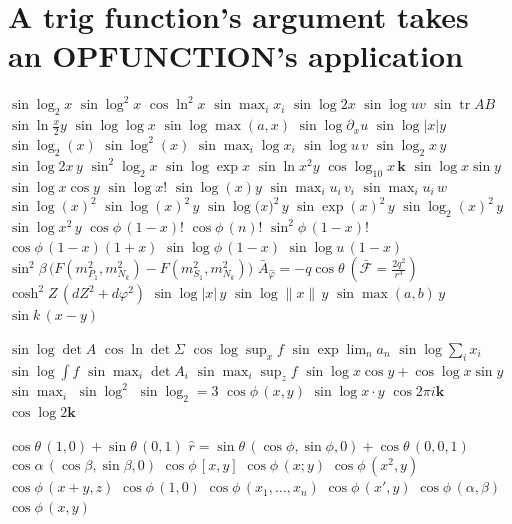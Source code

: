 \documentclass{article}
\begin{document}
\section{A trig function's argument takes an OPFUNCTION's application}
$\sin\log_2 x$ $\sin\log^2 x$ $\cos\ln^2 x$ $\sin\max_i x_i$ $\sin\log 2x$ $\sin\log uv$ $\sin\operatorname{tr}AB$ $\sin\ln\frac{x}{2}y$
$\sin\log\log x$ $\sin\log\max(a,x)$ $\sin\log\partial_x u$ $\sin\log|x|y$ $\sin\log_2(x)$ $\sin\log^2(x)$ $\sin\max_i\log x_i$
$\sin\log u\,v$ $\sin\log_2 x\,y$ $\sin\log 2x\,y$ $\sin^2\log_2 x$ $\sin\log\exp x$ $\sin\ln x^2 y$ $\cos\log_{10}x\,\mathbf k$
$\sin\log x\sin y$ $\sin\log x\cos y$ $\sin\log x!$ $\sin\log(x)y$ $\sin\max_i u_i\,v_i$ $\sin\max_i u_i\,w$
$\sin\log(x)^2$ $\sin\log(x)^2\,y$ $\sin\log\bigl(x\bigr)^{2}\,y$ $\sin\exp(x)^2\,y$ $\sin\log_2(x)^2\,y$ $\sin\log x^2\,y$
$\cos\phi\,(1-x)!$ $\cos\phi\,(n)!$ $\sin^2\phi\,(1-x)!$ $\cos\phi\,(1-x)(1+x)$ $\sin\log\phi\,(1-x)$ $\sin\log u\,(1-x)$
$\sin^{2}\beta\,\big(F(m_{P_{1}}^{2},m_{N_{k}}^{2})-F(m_{S_{1}}^{2},m_{N_{k}}^{2})\big)$
$\bar{A}_{\hat{\varphi}}=-q\cos\theta~(\bar{\mathcal{F}}=\frac{2q^{2}}{r^{4}})$ $\cosh^{2}Z\,(dZ^{2}+d\varphi^{2})$
$\sin\log|x|\,y$ $\sin\log\|x\|\,y$ $\sin\max(a,b)\,y$ $\sin k\,(x-y)$

$\sin\log\det A$ $\cos\ln\det\Sigma$ $\cos\log\sup_x f$ $\sin\exp\lim_n a_n$ $\sin\log\sum_i x_i$ $\sin\log\int f$ $\sin\max_i\det A_i$
$\sin\max_i\sup_z f$ $\sin\log x\cos y+\cos\log x\sin y$ $\sin\max_i$ $\sin\log^2$ $\sin\log_2=3$ $\cos\phi\,(x,y)$
$\sin\log x\cdot y$ $\cos 2\pi i\mathbf{k}$ $\cos\log 2\mathbf{k}$

$\cos\theta\,(1,0)+\sin\theta\,(0,1)$ $\hat{r}=\sin\theta\,(\cos\phi,\sin\phi,0)+\cos\theta\,(0,0,1)$
$\cos\alpha\,(\cos\beta,\sin\beta,0)$ $\cos\phi\,[x,y]$ $\cos\phi\,(x;y)$ $\cos\phi\,(x^2,y)$ $\cos\phi\,(x+y,z)$ $\cos\phi\,\left(1,0\right)$
$\cos\phi\,(x_1,\ldots,x_n)$ $\cos\phi\,(x',y)$ $\cos\phi\,(\alpha,\beta)$ $\cos\phi\,\left(x,y\right)$
\end{document}
